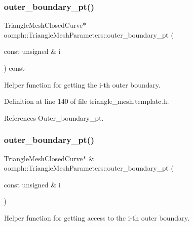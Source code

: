 \subsubsection{\texorpdfstring{outer\+\_\+boundary\+\_\+pt()}{outer\_boundary\_pt()}\hspace{0.1cm}{\footnotesize\ttfamily [3/4]}}
{\footnotesize\ttfamily Triangle\+Mesh\+Closed\+Curve$\ast$ oomph\+::\+Triangle\+Mesh\+Parameters\+::outer\+\_\+boundary\+\_\+pt (\begin{DoxyParamCaption}\item[{const unsigned \&}]{i }\end{DoxyParamCaption}) const\hspace{0.3cm}{\ttfamily [inline]}}



Helper function for getting the i-\/th outer boundary. 



Definition at line 140 of file triangle\+\_\+mesh.\+template.\+h.



References Outer\+\_\+boundary\+\_\+pt.

\mbox{\label{classoomph_1_1TriangleMeshParameters_aeefafcb68aba56fcc64806359feb32aa}} 
\subsubsection{\texorpdfstring{outer\+\_\+boundary\+\_\+pt()}{outer\_boundary\_pt()}\hspace{0.1cm}{\footnotesize\ttfamily [4/4]}}
{\footnotesize\ttfamily Triangle\+Mesh\+Closed\+Curve$\ast$ \& oomph\+::\+Triangle\+Mesh\+Parameters\+::outer\+\_\+boundary\+\_\+pt (\begin{DoxyParamCaption}\item[{const unsigned \&}]{i }\end{DoxyParamCaption})\hspace{0.3cm}{\ttfamily [inline]}}



Helper function for getting access to the i-\/th outer boundary. 



